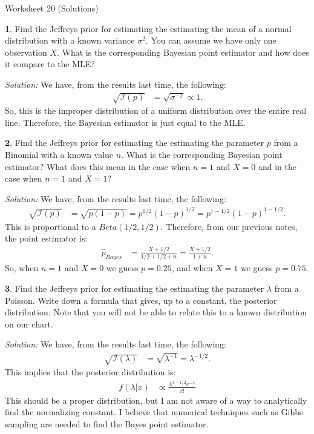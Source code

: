 \documentclass{tufte-handout}
\begin{document}
\justify

{\LARGE Worksheet 20 (Solutions)}

\vspace*{18pt}


\textbf{1}. Find the Jeffreys prior for estimating the estimating the mean of a normal
distribution with a known variance $\sigma^2$. You can assume we have only one
observation $X$. What is the corresponding
Bayesian point estimator and how does it compare to the MLE?

\textit{Solution:} We have, from the results last time, the following:
\begin{align*}
\sqrt{\mathcal{I}(p)} &= \sqrt{\sigma^{-2}} \propto 1.
\end{align*}
So, this is the improper distribution of a uniform distribution over the entire
real line. Therefore, the Bayesian estimator is just equal to the MLE.

\textbf{2}. Find the Jeffreys prior for estimating the estimating the parameter $p$ from a
Binomial with a known value $n$. What is the corresponding Bayesian point estimator?
What does this mean in the case when $n=1$ and $X=0$ and in the case when $n=1$ and $X=1$?

\textit{Solution:} We have, from the results last time, the following:
\begin{align*}
\sqrt{\mathcal{I}(p)} &= \sqrt{p(1-p)} = p^{1/2} (1 - p)^{1/2} = p^{1-1/2} (1-p)^{1-1/2}.
\end{align*}
This is proportional to a $Beta(1/2,1/2)$. Therefore, from our previous notes, the 
point estimator is:
\begin{align*}
\widehat{p}_{Bayes} &= \frac{X + 1/2}{1/2 + 1/2 + n} = \frac{X + 1/2}{1 + n}.
\end{align*}
So, when $n=1$ and $X=0$ we guess $p=0.25$, and when $X=1$ we guess $p=0.75$.

\textbf{3}. Find the Jeffreys prior for estimating the estimating the parameter $\lambda$ from
a Poisson. Write down a formula that gives, up to a constant,
the posterior distribution. Note that you will not be able to relate this to a 
known distribution on our chart.

\textit{Solution:} We have, from the results last time, the following:
\begin{align*}
\sqrt{\mathcal{I}(\lambda)} &= \sqrt{\lambda^{-1}} = \lambda^{-1/2}.
\end{align*}
This implies that the posterior distribution is:
\begin{align*}
f(\lambda | x) &\propto \frac{\lambda^{x-1/2} e^{-\lambda}}{x!}
\end{align*}
This should be a proper distribution, but I am not aware of a way to analytically
find the normalizing constant. I believe that numerical techniques such as Gibbs
sampling are needed to find the Bayes point estimator.
\end{document}
